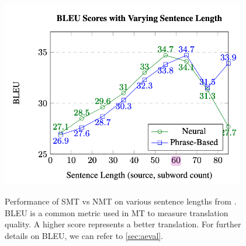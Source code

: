 \begin{figure}[h]
    {\includegraphics[width=0.95\textwidth]{img/bleusentencelength.png}}
    \centering
    \caption{Performance of SMT vs NMT on various sentence lengths from .
    BLEU is a common metric used in MT to measure translation quality. A higher score represents a better translation. For further details on BLEU, we can refer to \cref{sec:aeval}.}
    \label{img:bleusentlength}
\end{figure}


